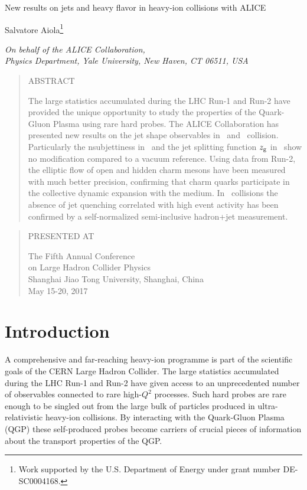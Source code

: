 \documentclass[10pt]{article}
\def\Title#1{\begin{center} {\Large #1 } \end{center}}
\def\Author#1{\begin{center}{ \sc #1} \end{center}}
\def\Address#1{\begin{center}{ \it #1} \end{center}}
\newcommand\pubblock{\rightline{\begin{tabular}{l} Proceedings of the Fifth Annual LHCP\\ \pubnumber\\
         \pubdate  \end{tabular}}}
\newenvironment{Abstract}{\begin{quotation} \begin{center} 
             \large ABSTRACT \end{center}\bigskip 
      \begin{center}\begin{large}}{\end{large}\end{center} \end{quotation}}
\newenvironment{Presented}{\begin{quotation} \begin{center} 
             PRESENTED AT\end{center}\bigskip 
      \begin{center}\begin{large}}{\end{large}\end{center} \end{quotation}}
\newcommand\pubnumber{ }
\newcommand\pubdate{\today}
\def\affiliation{
On behalf of the ALICE Collaboration, \\
Physics Department, Yale University, New Haven, CT 06511, USA}
\def\support{\footnote{Work supported by the U.S. Department of Energy under grant number DE-SC0004168.}}
\begin{document}
\large
\begin{titlepage}
\pubblock


\vfill
\Title{New results on jets and heavy flavor in heavy-ion collisions with ALICE}
\vfill

\Author{Salvatore Aiola\support}
\Address{\affiliation}
\vfill
\begin{Abstract}
The large statistics accumulated during the LHC Run-1 and Run-2 have provided the unique opportunity to study the properties of the Quark-Gluon Plasma
using rare hard probes. The ALICE Collaboration has presented new results on the jet shape observables in \pPb\ and \PbPb\ collision. Particularly the nsubjettiness in \PbPb\ 
and the jet splitting function $z_{\rm g}$ in \pPb\ show no modification
compared to a vacuum reference. Using data from Run-2, the elliptic flow of open and hidden charm mesons have been measured with much better precision,
confirming that charm quarks participate in the collective dynamic expansion with the medium. In \pPb\ collisions the absence of jet quenching 
correlated with high event activity has been confirmed by a self-normalized semi-inclusive hadron+jet measurement.
\end{Abstract}
\vfill

\begin{Presented}
The Fifth Annual Conference\\
 on Large Hadron Collider Physics \\
Shanghai Jiao Tong University, Shanghai, China\\ 
May 15-20, 2017
\end{Presented}
\vfill
\end{titlepage}
\def\thefootnote{\fnsymbol{footnote}}
\setcounter{footnote}{0}
%

\normalsize 


\section{Introduction}
A comprehensive and far-reaching heavy-ion programme is part of the scientific goals of the CERN Large Hadron Collider.
The large statistics accumulated during the LHC Run-1 and Run-2 have given access to an unprecedented number of observables connected to rare high-$Q^2$ processes.
Such hard probes are rare enough to be singled out from the large bulk of particles produced in ultra-relativistic heavy-ion collisions. By interacting with the Quark-Gluon Plasma (QGP) these self-produced probes
become carriers of crucial pieces of information about the transport properties of the QGP.
\end{document}
